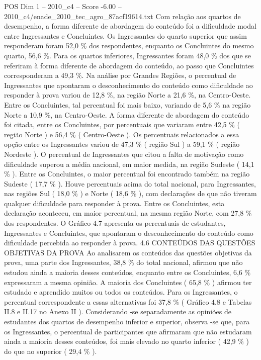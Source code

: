 \begin{textsample}{POS Dim 1 – 2010\_c4 – Score -6.00 – 2010\_c4/enade\_2010\_tec\_agro\_87acf19614.txt}
Com relação aos quartos de desempenho, a forma diferente de abordagem do conteúdo foi a dificuldade modal entre Ingressantes e Concluintes.
Os Ingressantes do quarto superior que assim responderam foram 52,0 \% dos respondentes, enquanto os Concluintes do mesmo quarto, 56,6 \%.
Para os quartos inferiores, Ingressantes foram 48,0 \% dos que se referiram à forma diferente de abordagem do conteúdo, ao passo que Concluintes corresponderam a 49,3 \%.
Na análise por Grandes Regiões, o percentual de Ingressantes que apontaram o desconhecimento do conteúdo como dificuldade ao responder à prova variou de 12,8 \%, na região Norte a 21,6 \%, na Centro-Oeste.
Entre os Concluintes, tal percentual foi mais baixo, variando de 5,6 \% na região Norte a 10,9 \%, na Centro-Oeste.
A forma diferente de abordagem do conteúdo foi citada, entre os Concluintes, por percentuais que variaram entre 42,5 \% ( região Norte ) e 56,4 \% ( Centro-Oeste ).
Os percentuais relacionados a essa opção entre os Ingressantes variou de 47,3 \% ( região Sul ) a 59,1 \% ( região Nordeste ).
O percentual de Ingressantes que citou a falta de motivação como dificuldade superou a média nacional, em maior medida, na região Sudeste ( 14,1 \% ).
Entre os Concluintes, o maior percentual foi encontrado também na região Sudeste ( 17,7 \% ).
Houve percentuais acima do total nacional, para Ingressantes, nas regiões Sul ( 18,0 \% ) e Norte ( 18,6 \% ), com declarações de que não tiveram qualquer dificuldade para responder à prova.
Entre os Concluintes, esta declaração aconteceu, em maior percentual, na mesma região Norte, com 27,8 \% dos respondentes.
O Gráfico 4.7 apresenta os percentuais de estudantes, Ingressantes e Concluintes, que apontaram o desconhecimento do conteúdo como dificuldade percebida ao responder à prova. 4.6 CONTEÚDOS DAS QUESTÕES OBJETIVAS DA PROVA Ao analisarem os conteúdos das questões objetivas da prova, uma parte dos Ingressantes, 38,8 \% do total nacional, afirmou que não estudou ainda a maioria desses conteúdos, enquanto entre os Concluintes, 6,6 \% expressaram a mesma opinião.
A maioria dos Concluintes ( 65,8 \% ) afirmou ter estudado e aprendido muitos ou todos os conteúdos.
Para os Ingressantes, o percentual correspondente a essas alternativas foi 37,8 \% ( Gráfico 4.8 e Tabelas II.8 e II.17 no Anexo II ).
Considerando -se separadamente as opiniões de estudantes dos quartos de desempenho inferior e superior, observa -se que, para os Ingressantes, o percentual de participantes que afirmaram que não estudaram ainda a maioria desses conteúdos, foi mais elevado no quarto inferior ( 42,9 \% ) do que no superior ( 29,4 \% ).

\end{textsample}
